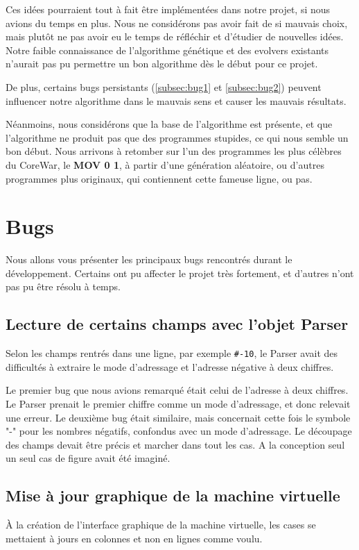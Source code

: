 \documentclass[hidelinks]{report}
\begin{document}
Ces idées pourraient tout à fait être implémentées dans notre projet, si nous avions du temps en plus. Nous ne considérons pas avoir fait de si mauvais choix, mais plutôt ne pas avoir eu le temps de réfléchir et d'étudier de nouvelles idées. Notre faible connaissance de l'algorithme génétique et des evolvers existants n'aurait pas pu permettre un bon algorithme dès le début pour ce projet. 

De plus, certains bugs persistants (\autoref{subsec:bug1} et \autoref{subsec:bug2}) peuvent influencer notre algorithme dans le mauvais sens et causer les mauvais résultats.

Néanmoins, nous considérons que la base de l'algorithme est présente, et que l'algorithme ne produit pas que des programmes stupides, ce qui nous semble un bon début. Nous arrivons à retomber sur l'un des programmes les plus célèbres du CoreWar, le \textbf{MOV 0 1}, à partir d'une génération aléatoire, ou d'autres programmes plus originaux, qui contiennent cette fameuse ligne, ou pas.
\section{Bugs}
Nous allons vous présenter les principaux bugs rencontrés durant le développement. Certains ont pu affecter le projet très fortement, et d'autres n'ont pas pu être résolu à temps. 
\subsection{Lecture de certains champs avec l'objet Parser}
Selon les champs rentrés dans une ligne, par exemple \texttt{\#-10}, le Parser avait des difficultés à extraire le mode d'adressage et l'adresse négative à deux chiffres. 

Le premier bug que nous avions remarqué était celui de l'adresse à deux chiffres. Le Parser prenait le premier chiffre comme un mode d'adressage, et donc relevait une erreur. Le deuxième bug était similaire, mais concernait cette fois le symbole "-" pour les nombres négatifs, confondus avec un mode d'adressage. Le découpage des champs devait être précis et marcher dans tout les cas. A la conception seul un seul cas de figure avait été imaginé.
\subsection{Mise à jour graphique de la machine virtuelle}
À la création de l'interface graphique de la machine virtuelle, les cases se mettaient à jours en colonnes et non en lignes comme voulu.
\end{document}
